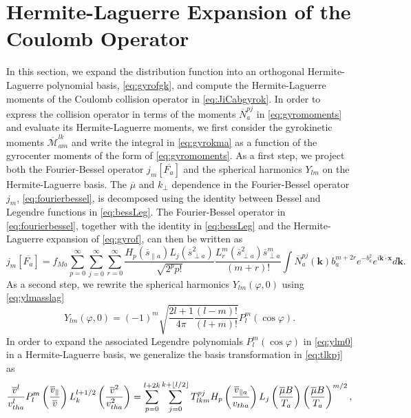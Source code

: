 \section{Hermite-Laguerre Expansion of the Coulomb Operator}
\label{eq:hermlag}
%
In this section, we expand the distribution function into an orthogonal Hermite-Laguerre polynomial basis, \cref{eq:gyrofgk}, and compute the Hermite-Laguerre moments of the Coulomb collision operator in \cref{eq:JiCabgyrok}.
%
In order to express the collision operator in terms of the moments $\overline N_a^{pj}$ in \cref{eq:gyromoments} and evaluate its Hermite-Laguerre moments, we first consider the gyrokinetic moments $\overline{\mathcal{M}}_{am}^{lk}$ and write the integral in \cref{eq:gyrokma} as a function of the gyrocenter moments of the form of \cref{eq:gyromoments}.
%
As a first step, we project both the Fourier-Bessel operator $j_m[\overline{F_a}]$ and the spherical harmonics $Y_{lm}$ on the Hermite-Laguerre basis.
%
The $\overline \mu$ and $k_\perp$ dependence in the Fourier-Bessel operator $j_m$, \cref{eq:fourierbessel}, is decomposed using the identity between Bessel and Legendre functions in \cref{eq:bessLeg}.
%
The Fourier-Bessel operator in \cref{eq:fourierbessel}, together with the identity in \cref{eq:bessLeg} and the Hermite-Laguerre expansion of \cref{eq:gyrof}, can then be written as
%
\begin{equation}
    j_m[\overline{F_a}]=f_{Ma}\sum_{p=0}^\infty \sum_{j=0}^\infty \sum_{r=0}^\infty \frac{H_p(\overline s_{\parallel a}) L_j(\overline s_{\perp a}^2)}{\sqrt{2^p p!}} \frac{L_r^m( \overline s_{\perp a}^2) \overline s_{\perp a}^m}{(m+r)!}\int \overline N_a^{pj}(\mathbf k)b_a^{m+2r}e^{-b_a^2} e^{i \mathbf k \cdot \mathbf x} d\mathbf k.
\label{eq:jmhplj}
\end{equation}
%
As a second step, we rewrite the spherical harmonics $Y_{lm}(\varphi,0)$ using \cref{eq:ylmasslag}
%
\begin{equation}
    Y_{lm}(\varphi,0)=(-1)^m\sqrt{\frac{2l+1}{4\pi}\frac{(l-m)!}{(l+m)!}}P_l^m(\cos \varphi).
\label{eq:ylm0}
\end{equation}
%
In order to expand the associated Legendre polynomials $P_l^m(\cos \varphi)$ in \cref{eq:ylm0} in a Hermite-Laguerre basis, we generalize the basis transformation in \cref{eq:tlkpj} as
%
\begin{equation}
    \frac{\overline v^l}{v_{tha}^l} P_l^m\left(\frac{\overline v_\parallel}{\overline v}\right) L_k^{l+1/2}\left(\frac{\overline v^2}{v_{tha}^2}\right) = \sum_{p=0}^{l+2k}\sum_{j=0}^{k+\lfloor l/2\rfloor}T_{lkm}^{pj}H_p\left(\frac{\overline v_{\parallel a}}{v_{tha}}\right)L_j\left(\frac{\overline \mu B}{T_a}\right)\left(\frac{\overline \mu B}{T_a}\right)^{m/2},
\label{eq:plljhplj}
\end{equation}
